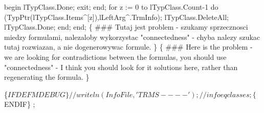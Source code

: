                   begin
                     lTypClass.Done;
                     exit;
                  end;
                  for z := 0 to lTypClass.Count-1 do
                     (TypPtr(lTypClass.Items^[z]),lLeftArg^.TrmInfo);
                  lTypClass.DeleteAll;
                  lTypClass.Done;
               end;
            end;
   \{ ### Tutaj jest problem - szukamy sprzecznosci miedzy formulami,
     nalezaloby wykorzystac "connectedness" - chyba nalezy szukac
     tutaj rozwiazan, a nie dogenerowywac formule.
   \}
   \{ ### Here is the problem - we are looking for contradictions between the formulas,
     you should use "connectedness" - I think you should look for it
     solutions here, rather than regenerating the formula.
   \}

   \{$IFDEF MDEBUG\}
   //writeln(InfoFile,'TRMS ----');
   //infoeqclasses;
   \{$ENDIF\} ;

